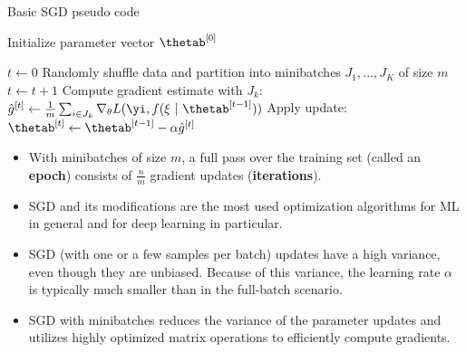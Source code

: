 
\begin{vbframe}

  \begin{algorithm}[H]
  \footnotesize
    \caption{Basic SGD pseudo code}
    \begin{algorithmic}[1]
    \State Initialize parameter vector $\thetab^{[0]}$ 
    
    \State $t \leftarrow 0$
    \State Randomly shuffle data and partition into minibatches $J_1, ..., J_K$ of size $m$
      \State $t \leftarrow t + 1$ 
      \State Compute gradient estimate with $J_k$: $\hat{g}^{[t]} \leftarrow \frac{1}{m} \sum_{i \in J_k} \nabla_\theta L(\yi, f(\xi ~|~ \thetab^{[t-1]})) $
      \State Apply update: $\thetab^{[t]} \leftarrow \thetab^{[t-1]} - \alpha \hat{g}^{[t]}$
      
      \EndFor
    
        
      \EndWhile
    \end{algorithmic}
  \end{algorithm}
 
\framebreak


\vspace*{0.5cm}
  \begin{itemize}
    \item With minibatches of size $m$, a full pass over the training set (called an \textbf{epoch}) consists of $\frac{n}{m}$ gradient updates (\textbf{iterations}).
    \item SGD and its modifications are the most used optimization algorithms for ML in general and for deep learning in particular.
    \item SGD (with one or a few samples per batch) updates have a high variance, even though they are unbiased. 
      Because of this variance, the learning rate $\alpha$ is typically much smaller than in the full-batch scenario.
    \item SGD with minibatches reduces the variance of the parameter updates and utilizes highly optimized matrix operations to efficiently compute gradients.
   \end{itemize}


\end{vbframe}
